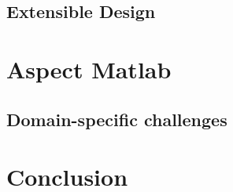 \documentclass{beamer}
\begin{document}
\subsection*{Extensible Design}  %

\section{Aspect Matlab} %



\subsection*{Domain-specific challenges} %

\section{Conclusion} %

\end{document}

